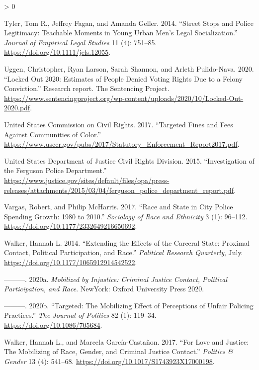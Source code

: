 \documentclass[
  12pt,
]{article}
\newlength{\cslhangindent}
\newenvironment{CSLReferences}[2] %
 {%
  \setlength{\parindent}{0pt}
  \ifodd #1 \everypar{\setlength{\hangindent}{\cslhangindent}}\ignorespaces\fi
  \ifnum #2 > 0
  \setlength{\parskip}{#2\baselineskip}
  \fi
 }%
 {}
\begin{document}
\begin{CSLReferences}{1}{0}
\leavevmode\hypertarget{ref-Tyler2014}{}%
Tyler, Tom R., Jeffrey Fagan, and Amanda Geller. 2014. {``Street {Stops} and {Police Legitimacy}: {Teachable Moments} in {Young Urban Men}'s {Legal Socialization}.''} \emph{Journal of Empirical Legal Studies} 11 (4): 751--85. \url{https://doi.org/10.1111/jels.12055}.

\leavevmode\hypertarget{ref-Uggen2020}{}%
Uggen, Christopher, Ryan Larson, Sarah Shannon, and Arleth Pulido-Nava. 2020. {``Locked {Out} 2020: {Estimates} of {People Denied Voting Rights Due} to a {Felony Conviction}.''} Research report. {The Sentencing Project}. \url{https://www.sentencingproject.org/wp-content/uploads/2020/10/Locked-Out-2020.pdf}.

\leavevmode\hypertarget{ref-UnitedStatesCommissiononCivilRights2017}{}%
United States Commission on Civil Rights. 2017. {``Targeted {Fines} and {Fees Against Communities} of {Color}.''} \url{https://www.usccr.gov/pubs/2017/Statutory_Enforcement_Report2017.pdf}.

\leavevmode\hypertarget{ref-UnitedStatesDepartmentofJusticeCivilRightsDivision2015}{}%
United States Department of Justice Civil Rights Division. 2015. {``Investigation of the {Ferguson Police Department}.''} \url{https://www.justice.gov/sites/default/files/opa/press-releases/attachments/2015/03/04/ferguson_police_department_report.pdf}.

\leavevmode\hypertarget{ref-Vargas2017a}{}%
Vargas, Robert, and Philip McHarris. 2017. {``Race and {State} in {City Police Spending Growth}: 1980 to 2010.''} \emph{Sociology of Race and Ethnicity} 3 (1): 96--112. \url{https://doi.org/10.1177/2332649216650692}.

\leavevmode\hypertarget{ref-Walker2014}{}%
Walker, Hannah L. 2014. {``Extending the {Effects} of the {Carceral State}: {Proximal Contact}, {Political Participation}, and {Race}.''} \emph{Political Research Quarterly}, July. \url{https://doi.org/10.1177/1065912914542522}.

\leavevmode\hypertarget{ref-Walker2020a}{}%
---------. 2020a. \emph{Mobilized by Injustice: Criminal Justice Contact, Political Participation, and Race}. {NewYork}: {Oxford University Press 2020}.

\leavevmode\hypertarget{ref-Walker2020}{}%
---------. 2020b. {``Targeted: {The Mobilizing Effect} of {Perceptions} of {Unfair Policing Practices}.''} \emph{The Journal of Politics} 82 (1): 119--34. \url{https://doi.org/10.1086/705684}.

\leavevmode\hypertarget{ref-Walker2017}{}%
Walker, Hannah L., and Marcela García-Castañon. 2017. {``For {Love} and {Justice}: {The Mobilizing} of {Race}, {Gender}, and {Criminal Justice Contact}.''} \emph{Politics \& Gender} 13 (4): 541--68. \url{https://doi.org/10.1017/S1743923X17000198}.


\end{CSLReferences}
\end{document}
